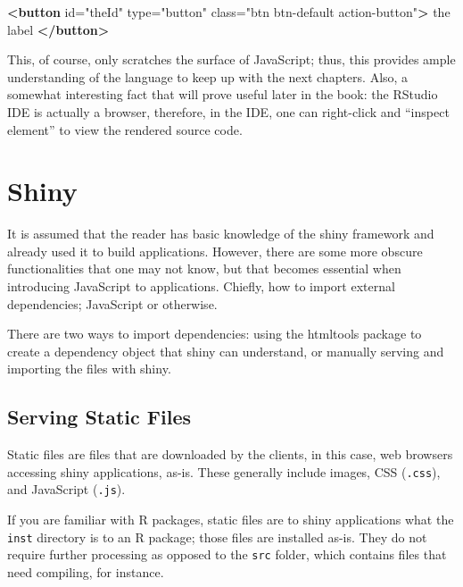 \documentclass[
  10pt,
]{krantz}
\makeatletter
\newenvironment{Shaded}{\begin{snugshade}}{\end{snugshade}}
\newcommand{\KeywordTok}[1]{\textcolor[rgb]{0.27,0.27,0.27}{\textbf{#1}}}
\newcommand{\NormalTok}[1]{#1}
\newcommand{\OtherTok}[1]{\textcolor[rgb]{0.37,0.37,0.37}{#1}}
\newcommand{\StringTok}[1]{\textcolor[rgb]{0.5,0.5,0.5}{#1}}
\newenvironment{kframe}{%
\medskip{}
\setlength{\fboxsep}{.8em}
 \def\at@end@of@kframe{}%
 \ifinner\ifhmode%
  \def\at@end@of@kframe{\end{minipage}}%
  \begin{minipage}{\columnwidth}%
 \fi\fi%
 \def\FrameCommand##1{\hskip\@totalleftmargin \hskip-\fboxsep
 \colorbox{shadecolor}{##1}\hskip-\fboxsep
     \hskip-\linewidth \hskip-\@totalleftmargin \hskip\columnwidth}%
 \MakeFramed {\advance\hsize-\width
   \@totalleftmargin\z@ \linewidth\hsize
   \@setminipage}}%
 {\par\unskip\endMakeFramed%
 \at@end@of@kframe}
\renewenvironment{Shaded}{\begin{kframe}}{\end{kframe}}
\makeatother
\begin{document}
\begin{Shaded}
\begin{Highlighting}[]
\KeywordTok{<button} 
\OtherTok{  id=}\StringTok{"theId"} 
\OtherTok{  type=}\StringTok{"button"} 
\OtherTok{  class=}\StringTok{"btn btn{-}default action{-}button"}\KeywordTok{>}
\NormalTok{  the label}
\KeywordTok{</button>}
\end{Highlighting}
\end{Shaded}

This, of course, only scratches the surface of JavaScript; thus, this provides ample understanding of the language to keep up with the next chapters. Also, a somewhat interesting fact that will prove useful later in the book: the RStudio IDE is actually a browser, therefore, in the IDE, one can right-click and ``inspect element'' to view the rendered source code.

\hypertarget{basics-shiny}{%
\section{Shiny}\label{basics-shiny}}

It is assumed that the reader has basic knowledge of the shiny framework and already used it to build applications. However, there are some more obscure functionalities that one may not know, but that becomes essential when introducing JavaScript to applications. Chiefly, how to import external dependencies; JavaScript or otherwise.

There are two ways to import dependencies: using the htmltools \citep{R-htmltools} package to create a dependency object that shiny can understand, or manually serving and importing the files with shiny.

\hypertarget{basics-static-files}{%
\subsection{Serving Static Files}\label{basics-static-files}}

Static files are files that are downloaded by the clients, in this case, web browsers accessing shiny applications, as-is. These generally include images, CSS (\texttt{.css}), and JavaScript (\texttt{.js}).

If you are familiar with R packages, static files are to shiny applications what the \texttt{inst} directory is to an R package; those files are installed as-is. They do not require further processing as opposed to the \texttt{src} folder, which contains files that need compiling, for instance.
\end{document}

